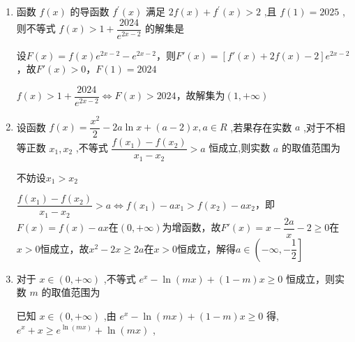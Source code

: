\begin{enumerate}
\begin{jieda}
            ${x}^{2}f\left( x\right)  - {4f}\left( 2\right)  < {x}^{2} - 4 \Longleftrightarrow F(x) < F(2)$，故解集为$\left( {-2,0}\right)  \cup  \left( {0,2}\right)$
        \end{jieda}
        \item 函数 $f\left( x\right)$ 的导函数 ${f}^{\prime }\left( x\right)$ 满足 ${2f}\left( x\right)  + {f}^{\prime }\left( x\right)  > 2$ ,且 $f\left( 1\right)  = {2025}$ ,则不等式 $f\left( x\right)  > 1 + \dfrac{2024}{{{e}}^{{2x} - 2}}$ 的解集是
        \begin{jieda}
            设$F(x) = f(x)e^{2x-2}-e^{2x-2}$，则$F'(x) = [f'(x)+2f(x)-2]e^{2x-2}$，故$F'(x) > 0$，$F(1) = 2024$

            $f\left( x\right)  > 1 + \dfrac{2024}{{{e}}^{{2x} - 2}} \Longleftrightarrow F(x) > 2024$，故解集为$\left( {1, + \infty }\right)$

        \end{jieda}
        
        \item 设函数 $f\left( x\right)  = \dfrac{{x}^{2}}{2} - {2a}\ln x + \left( {a - 2}\right) x,a \in  R$ ,若果存在实数 $a$ ,对于不相等正数 ${x}_{1},{x}_{2}$ ,不等式 $\dfrac{f\left( {x}_{1}\right)  - f\left( {x}_{2}\right) }{{x}_{1} - {x}_{2}} > a$ 恒成立,则实数 $a$ 的取值范围为\blkda{$\left(-\infty, -\dfrac{1}{2}\right]$}
        \begin{jieda}
            不妨设$x_1 > x_2$
            
            $\dfrac{f\left( {x}_{1}\right)  - f\left( {x}_{2}\right) }{{x}_{1} - {x}_{2}} > a \Longleftrightarrow f(x_1)-ax_1 > f(x_2)-ax_2$，即$F(x) = f(x)-ax$在$(0, +\infty)$为增函数，故$F'(x) = x-\dfrac{2a}{x}-2 \geq  0$在$x > 0$恒成立，故$x^2-2x \geq 2a$在$x > 0$恒成立，解得$a \in \left(-\infty, -\dfrac{1}{2}\right]$
        \end{jieda}
        
        \item 对于 $x \in  \left( {0, + \infty }\right)$ ,不等式 ${{e}}^{x} - \ln \left( {mx}\right)  + \left( {1 - m}\right) x \geq  0$ 恒成立，则实数 $m$ 的取值范围为

        \begin{jieda}
            已知 $x \in  \left( {0, + \infty }\right)$ ,由 ${{e}}^{x} - \ln \left( {mx}\right)  + \left( {1 - m}\right) x \geq  0$ 得, ${{e}}^{x} + x \geq  {{e}}^{\ln \left( {mx}\right) } + \ln \left( {mx}\right)$ ,
            

\end{jieda}
\end{enumerate}
